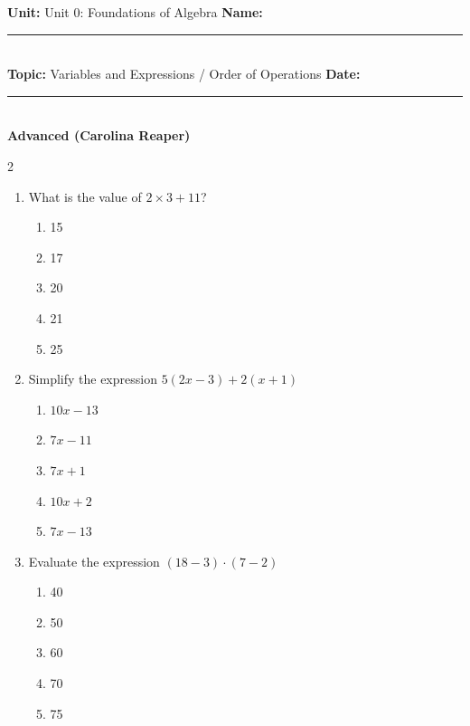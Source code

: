 \documentclass[10pt]{article}
\begin{document}
\enlargethispage{2.5cm}

\begin{tcolorbox}[colback=mainblue!5, colframe=mainblue, sharp corners, boxrule=0.5pt]
    \small \textbf{Unit:} Unit 0: Foundations of Algebra \hfill \textbf{Name:} \rule{3cm}{0.4pt} \\
    \small \textbf{Topic:} Variables and Expressions / Order of Operations \hfill \textbf{Date:} \rule{2cm}{0.4pt} \\
    \centering \textbf{\large Advanced (Carolina Reaper)}
\end{tcolorbox}

\vspace{0.2cm}

\begin{multicols}{2}
\begin{enumerate}[label=\textbf{Q\arabic*.}, leftmargin=*, itemsep=6pt, parsep=0pt]

  \item \small What is the value of $2 \times 3 + 11$?
  \begin{enumerate}[label=(\Alph*), leftmargin=0.6cm, nosep, itemsep=2pt]
    \item 15
    \item 17
    \item 20
    \item 21
    \item 25
  \end{enumerate}

  \item \small Simplify the expression $5(2x - 3) + 2(x + 1)$
  \begin{enumerate}[label=(\Alph*), leftmargin=0.6cm, nosep, itemsep=2pt]
    \item $10x - 13$
    \item $7x - 11$
    \item $7x + 1$
    \item $10x + 2$
    \item $7x - 13$
  \end{enumerate}

  \item \small Evaluate the expression $(18 - 3) \cdot (7 - 2)$
  \begin{enumerate}[label=(\Alph*), leftmargin=0.6cm, nosep, itemsep=2pt]
    \item 40
    \item 50
    \item 60
    \item 70
    \item 75
  \end{enumerate}


\end{enumerate}
\end{multicols}
\end{document}

